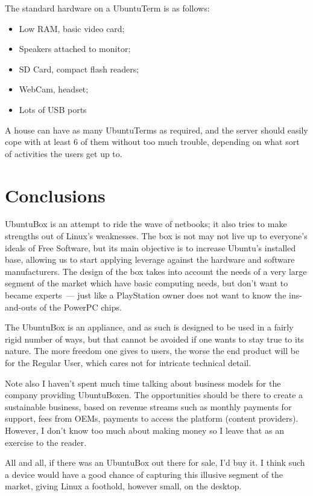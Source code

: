 \documentclass{memoir}
\begin{document}
The standard hardware on a UbuntuTerm is as follows:

\begin{itemize}
\item Low RAM, basic video card;
\item Speakers attached to monitor;
\item SD Card, compact flash readers;
\item WebCam, headset;
\item Lots of USB ports
\end{itemize}

A house can have as many UbuntuTerms as required, and the server
should easily cope with at least 6 of them without too much trouble,
depending on what sort of activities the users get up to.

\section{Conclusions}

UbuntuBox is an attempt to ride the wave of netbooks; it also tries to
make strengths out of Linux's weaknesses. The box is not may not live
up to everyone's ideals of Free Software, but its main objective is to
increase Ubuntu's installed base, allowing us to start applying
leverage against the hardware and software manufacturers. The design
of the box takes into account the needs of a very large segment of the
market which have basic computing needs, but don't want to became
experts~--- just like a PlayStation owner does not want to know the
ins-and-outs of the PowerPC chips.

The UbuntuBox is an appliance, and as such is designed to be used in a
fairly rigid number of ways, but that cannot be avoided if one wants
to stay true to its nature. The more freedom one gives to users, the
worse the end product will be for the Regular User, which cares not
for intricate technical detail.

Note also I haven't spent much time talking about business models for
the company providing UbuntuBoxen. The opportunities should be there
to create a sustainable business, based on revenue streams such as
monthly payments for support, fees from OEMs, payments to access the
platform (content providers). However, I don't know too much about
making money so I leave that as an exercise to the reader.

All and all, if there was an UbuntuBox out there for sale, I'd buy
it. I think such a device would have a good chance of capturing this
illusive segment of the market, giving Linux a foothold, however
small, on the desktop.
\end{document}
